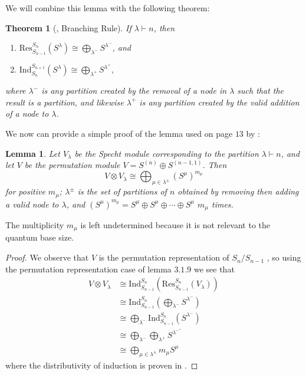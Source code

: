 \documentclass[12pt,twoside]{reedthesis}
\theoremstyle{plain}   %
\newtheorem{thm}{Theorem}[section] %
\newtheorem{lemma}{Lemma}[section]
\theoremstyle{definition}
\theoremstyle{remark}
\numberwithin{equation}{section}
\def\ind{\mathrm{Ind}}
\def\res{\mathrm{Res}}
\begin{document}
  We will combine this lemma with the following theorem:
  \begin{thm}[{\cite[2.8.3]{sagan}, Branching Rule}]
    If $\lambda \vdash n$, then
    \begin{enumerate}
    \item $\res^{S_{n}}_{S_{n-1}} (S^\lambda) \cong \bigoplus_{\lambda^-} S^{\lambda^-}$, and
    \item $\ind^{S_{n+1}}_{S_{n}} (S^\lambda) \cong \bigoplus_{\lambda^+} S^{\lambda^+},$
    \end{enumerate}
    where $\lambda^-$ is any partition created by the removal of a node in $\lambda$ such that the result is a partition,
    and likewise $\lambda^+$ is any partition created by the valid addition of a node to $\lambda$.
  \end{thm}
  We now can provide a simple proof of the lemma used on page $13$ by \cite{copeland}:
  \begin{lemma}
    Let $V_\lambda$ be the Specht module corresponding to the partition $\lambda \vdash n$, and let $V$ be the permutation module $V = S^{(n)} \oplus S^{(n-1,1)}$.
    Then
    \[V \otimes V_\lambda \cong \bigoplus_ {\mu \in \lambda^\pm} (S^\mu)^{m_\mu} \]
    for positive $m_\mu$; $\lambda^\pm$ is the set of partitions of $n$ obtained by removing then adding a valid node to $\lambda$,
    and $(S^\mu)^{m_\mu} = S^\mu \oplus S^\mu \oplus \cdots \oplus S^\mu $ $m_\mu$ times.
  \end{lemma}
  The multiplicity $m_\mu$ is left undetermined because it is not relevant to the quantum base size.
  \begin{proof}
    We observe that $V$ is the permutation representation of $S_n / S_{n-1}$ , so using the permutation representation case of lemma $3.1.9$ we see that
    \begin{align*}
      V \otimes V_\lambda &\cong \ind^{S_{n}}_{S_{n-1}} ( \res^{S_{n}}_{S_{n-1}} (V_\lambda))\\
                          &\cong \ind^{S_{n}}_{S_{n-1}} (\bigoplus_{\lambda^-} S^{\lambda^-})\\
                          &\cong \bigoplus_{\lambda^-} \ind^{S_{n}}_{S_{n-1}} ( S^{\lambda^-}) \\
                          &\cong \bigoplus_{\lambda^-} \bigoplus_{\lambda^+} S^{\lambda^{-^+}} \\
                          &\cong \bigoplus_ {\mu \in \lambda^\pm} m_\mu S^\mu
    \end{align*}
    where the distributivity of induction is proven in \cite[Exercise 3.15]{fulton2004}.
  \end{proof}
\end{document}
